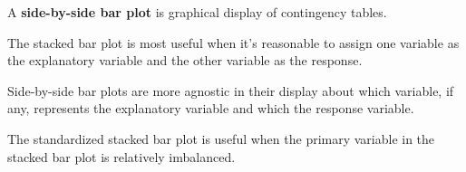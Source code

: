 \documentclass[handout]{beamer}
\begin{document}
\begin{frame}
\begin{definition}
A \textbf{side-by-side bar plot} is graphical display of contingency tables.
\end{definition}

\begin{example}
\begin{center}
\end{center}
\end{example}
\end{frame}

\begin{frame}
\begin{note}
The stacked bar plot is most useful when it's reasonable to assign one variable as the explanatory variable and the other variable as the response.
\end{note}\pause

\begin{note}
Side-by-side bar plots are more agnostic in their display about which variable, if any, represents the explanatory variable and which the response variable.
\end{note}\pause

\begin{note}
The standardized stacked bar plot is useful when the primary variable in the stacked bar plot is relatively imbalanced.
\end{note}
\end{frame}
\end{document}
